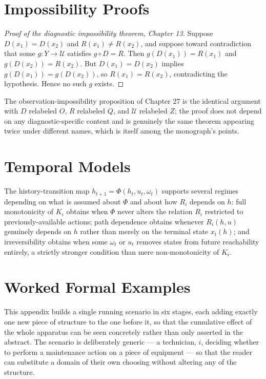 \documentclass[11pt]{report}
\theoremstyle{definition}
\theoremstyle{plain}
\newcommand{\Uni}{\mathcal{U}}
\begin{document}
\chapter{Impossibility Proofs}

\begin{proof}[Proof of the diagnostic impossibility theorem, Chapter 13]
Suppose $D(x_1) = D(x_2)$ and $R(x_1) \neq R(x_2)$, and suppose toward contradiction that some $g: Y \to \Uni$ satisfies $g \circ D = R$. Then $g(D(x_1)) = R(x_1)$ and $g(D(x_2)) = R(x_2)$. But $D(x_1) = D(x_2)$ implies $g(D(x_1)) = g(D(x_2))$, so $R(x_1) = R(x_2)$, contradicting the hypothesis. Hence no such $g$ exists. \qedhere
\end{proof}
The observation-impossibility proposition of Chapter 27 is the identical argument with $D$ relabeled $O$, $R$ relabeled $Q$, and $\Uni$ relabeled $Z$; the proof does not depend on any diagnostic-specific content and is genuinely the same theorem appearing twice under different names, which is itself among the monograph's points.

\chapter{Temporal Models}

The history-transition map $h_{t+1} = \Phi(h_t, u_t, \omega_t)$ supports several regimes depending on what is assumed about $\Phi$ and about how $R_i$ depends on $h$: full monotonicity of $K_i$ obtains when $\Phi$ never alters the relation $R_i$ restricted to previously-available actions; path dependence obtains whenever $R_i(h,u)$ genuinely depends on $h$ rather than merely on the terminal state $x_t(h)$; and irreversibility obtains when some $\omega_t$ or $u_t$ removes states from future reachability entirely, a strictly stronger condition than mere non-monotonicity of $K_i$.

\chapter{Worked Formal Examples}

This appendix builds a single running scenario in six stages, each adding exactly one new piece of structure to the one before it, so that the cumulative effect of the whole apparatus can be seen concretely rather than only asserted in the abstract. The scenario is deliberately generic --- a technician, $i$, deciding whether to perform a maintenance action on a piece of equipment --- so that the reader can substitute a domain of their own choosing without altering any of the structure.
\end{document}

